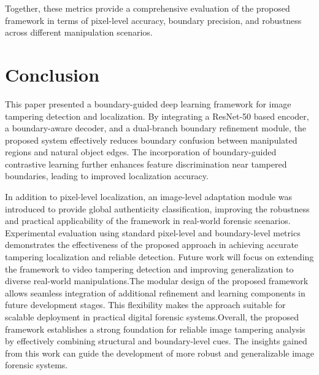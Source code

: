 \documentclass[runningheads]{llncs}
\begin{document}
\vspace{0.5em}

 Together, these metrics provide a comprehensive evaluation of the proposed framework in terms of pixel-level accuracy, boundary precision, and robustness across different manipulation scenarios.



\section{Conclusion}

This paper presented a boundary-guided deep learning framework for image tampering detection and localization. By integrating a ResNet-50 based encoder, a boundary-aware decoder, and a dual-branch boundary refinement module, the proposed system effectively reduces boundary confusion between manipulated regions and natural object edges. The incorporation of boundary-guided contrastive learning further enhances feature discrimination near tampered boundaries, leading to improved localization accuracy.

\vspace{0.5em}

In addition to pixel-level localization, an image-level adaptation module was introduced to provide global authenticity classification, improving the robustness and practical applicability of the framework in real-world forensic scenarios. Experimental evaluation using standard pixel-level and boundary-level metrics demonstrates the effectiveness of the proposed approach in achieving accurate tampering localization and reliable detection. Future work will focus on extending the framework to video tampering detection and improving generalization to diverse real-world manipulations.The modular design of the proposed framework allows seamless integration of additional refinement and learning components in future development stages. This flexibility makes the approach suitable for scalable deployment in practical digital forensic systems.Overall, the proposed framework establishes a strong foundation for reliable image tampering analysis by effectively combining structural and boundary-level cues. The insights gained from this work can guide the development of more robust and generalizable image forensic systems.

 





\end{document}

